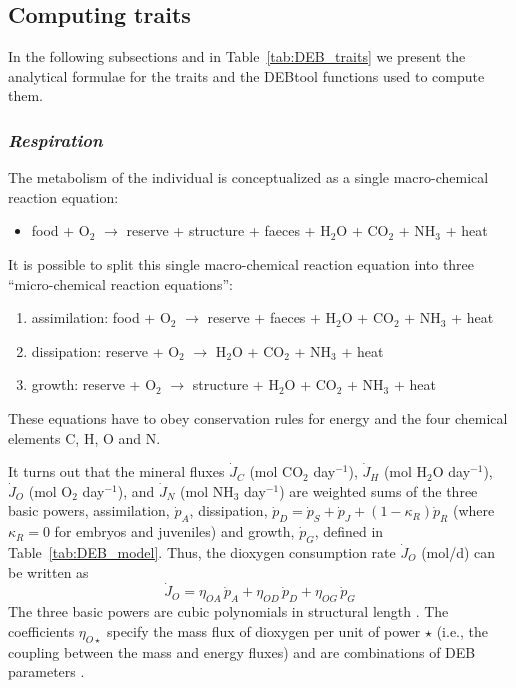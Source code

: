 \documentclass{article}
\begin{document}
\subsection{Computing traits}
In the following subsections and in Table~\ref{tab:DEB_traits} we present the analytical formulae for the traits  and the DEBtool functions used to compute them.

\subsubsection*{\it Respiration}
The metabolism of the individual is conceptualized as a single macro-chemical reaction equation:
\begin{itemize} 
 \item food + O$_2$ $\rightarrow$ reserve + structure + faeces + H$_2$O + CO$_2$ + NH$_3$ + heat
\end{itemize}

It is possible to split this single macro-chemical reaction equation into three ``micro-chemical reaction equations'':
\begin{enumerate}
	\item   assimilation: food     + O$_2$ $\rightarrow$ reserve + faeces + H$_2$O + CO$_2$ + NH$_3$ + heat
   \item  dissipation:  reserve + O$_2$  $\rightarrow$ H$_2$O + CO$_2$ + NH$_3$ + heat
   \item  growth:         reserve + O$_2$  $\rightarrow$ structure +  H$_2$O + CO$_2$ + NH$_3$ + heat
\end{enumerate}
These equations have to obey conservation rules for energy and the four chemical elements C, H, O and N.

It turns out that the mineral fluxes $\dot{J}_C$ (mol CO$_2$ day$^{-1}$), $\dot{J}_H$ (mol H$_2$O day$^{-1}$), $\dot{J}_O$ (mol O$_2$ day$^{-1}$), and $\dot{J}_N$ (mol NH$_3$ day$^{-1}$) are weighted sums of the three basic powers, assimilation, $\dot{p}_A$, dissipation, $\dot{p}_D = \dot{p}_S +\dot{p}_J + (1-\kappa_R)\dot{p}_R $ (where $\kappa_R=0$ for embryos and juveniles) and growth, $\dot{p}_G$, defined in  Table~\ref{tab:DEB_model}. 
Thus, the dioxygen consumption rate $\dot{J}_O$ (mol/d) can be written as
\begin{equation}
\dot{J}_O  =  \eta_{OA} \, \dot{p}_A + \eta_{OD} \, \dot{p}_D + \eta_{OG} \, \dot{p}_G
\end{equation}
The three basic powers are cubic polynomials in structural length  \cite[Chapter 2, Table 2.5]{Kooy2010}. The coefficients $\eta_{O \star}$ specify the mass flux of dioxygen per unit of power $\star$ (i.e., the coupling between the mass and energy fluxes) and are combinations of DEB parameters \cite[Chapter 4.3]{Kooy2010}.
\end{document}

